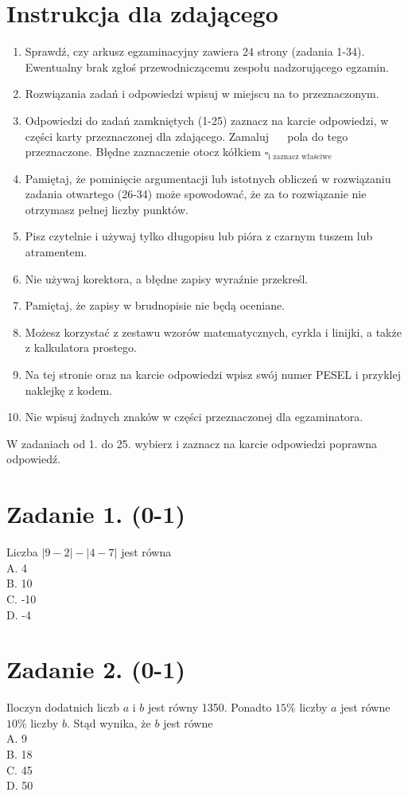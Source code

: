 \documentclass[10pt]{article}
\begin{document}
\section*{Instrukcja dla zdającego}
\begin{enumerate}
  \item Sprawdź, czy arkusz egzaminacyjny zawiera 24 strony (zadania 1-34). Ewentualny brak zgłoś przewodniczącemu zespołu nadzorującego egzamin.
  \item Rozwiązania zadań i odpowiedzi wpisuj w miejscu na to przeznaczonym.
  \item Odpowiedzi do zadań zamkniętych (1-25) zaznacz na karcie odpowiedzi, w części karty przeznaczonej dla zdającego. Zamaluj \(\quad\) pola do tego przeznaczone. Błędne zaznaczenie otocz kółkiem \(\square_{\text {i zaznacz właściwe }}\)
  \item Pamiętaj, że pominięcie argumentacji lub istotnych obliczeń w rozwiązaniu zadania otwartego (26-34) może spowodować, że za to rozwiązanie nie otrzymasz pełnej liczby punktów.
  \item Pisz czytelnie i używaj tylko długopisu lub pióra z czarnym tuszem lub atramentem.
  \item Nie używaj korektora, a błędne zapisy wyraźnie przekreśl.
  \item Pamiętaj, że zapisy w brudnopisie nie będą oceniane.
  \item Możesz korzystać z zestawu wzorów matematycznych, cyrkla i linijki, a także z kalkulatora prostego.
  \item Na tej stronie oraz na karcie odpowiedzi wpisz swój numer PESEL i przyklej naklejkę z kodem.
  \item Nie wpisuj żadnych znaków w części przeznaczonej dla egzaminatora.
\end{enumerate}

W zadaniach od 1. do 25. wybierz i zaznacz na karcie odpowiedzi poprawna odpowiedź.

\section*{Zadanie 1. (0-1)}
Liczba \(|9-2|-|4-7|\) jest równa\\
A. 4\\
B. 10\\
C. -10\\
D. -4

\section*{Zadanie 2. (0-1)}
Iloczyn dodatnich liczb \(a\) i \(b\) jest równy 1350. Ponadto \(15 \%\) liczby \(a\) jest równe \(10 \%\) liczby \(b\). Stąd wynika, że \(b\) jest równe\\
A. 9\\
B. 18\\
C. 45\\
D. 50
\end{document}
